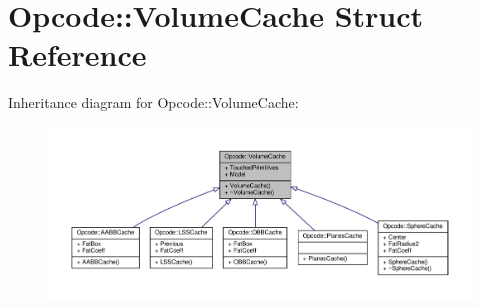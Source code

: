 \hypertarget{structOpcode_1_1VolumeCache}{}\section{Opcode\+:\+:Volume\+Cache Struct Reference}
\label{structOpcode_1_1VolumeCache}


Inheritance diagram for Opcode\+:\+:Volume\+Cache\+:
\nopagebreak
\begin{figure}[H]
\begin{center}
\leavevmode
\includegraphics[width=350pt]{dc/d13/structOpcode_1_1VolumeCache__inherit__graph}
\end{center}
\end{figure}


